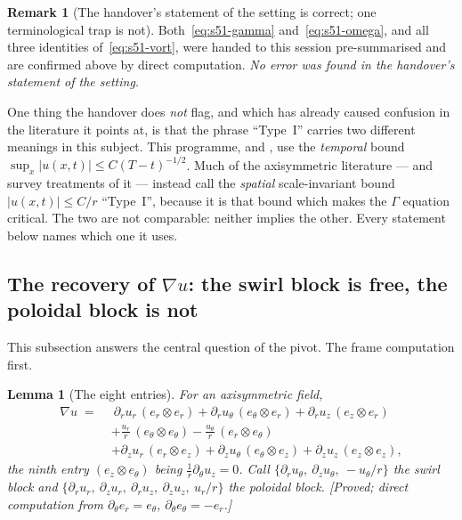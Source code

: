 \documentclass[11pt]{article}
\newtheorem{lemma}[theorem]{Lemma}
\theoremstyle{definition}
\newtheorem{remark}[theorem]{Remark}
\theoremstyle{remark}
\begin{document}
\begin{remark}[The handover's statement of the setting is correct; one
  terminological trap is not]\label{rem:s51-handover}
  Both~\eqref{eq:s51-gamma} and~\eqref{eq:s51-omega}, and all three identities
  of~\eqref{eq:s51-vort}, were handed to this session pre-summarised and are
  confirmed above by direct computation. \emph{No error was found in the
  handover's statement of the setting.}

  One thing the handover does \emph{not} flag, and which has already caused
  confusion in the literature it points at, is that the phrase ``Type~I''
  carries two different meanings in this subject. This programme, and
  \cite{KNSS2009}, use the \emph{temporal} bound
  $\sup_x|u(x,t)|\leq C(T-t)^{-1/2}$. Much of the axisymmetric literature ---
  and survey treatments of it --- instead call the \emph{spatial}
  scale-invariant bound $|u(x,t)|\leq C/r$ ``Type~I'', because it is that
  bound which makes the $\Gamma$ equation critical. The two are not
  comparable: neither implies the other. Every statement below names which one
  it uses.
\end{remark}

\subsection{The recovery of \texorpdfstring{$\nabla u$}{grad u}:
the swirl block is free, the poloidal block is not}
\label{subsec:s51-recovery}

This subsection answers the central question of the pivot. The frame
computation first.

\begin{lemma}[The eight entries]\label{lem:s51-frame}
  For an axisymmetric field,
  \begin{align*}
    \nabla u \;=\;&\ \partial_ru_r\,(e_r\!\otimes\!e_r)
      + \partial_ru_\theta\,(e_\theta\!\otimes\!e_r)
      + \partial_ru_z\,(e_z\!\otimes\!e_r) \\
    &+ \frac{u_r}{r}\,(e_\theta\!\otimes\!e_\theta)
      - \frac{u_\theta}{r}\,(e_r\!\otimes\!e_\theta) \\
    &+ \partial_zu_r\,(e_r\!\otimes\!e_z)
      + \partial_zu_\theta\,(e_\theta\!\otimes\!e_z)
      + \partial_zu_z\,(e_z\!\otimes\!e_z),
  \end{align*}
  the ninth entry $(e_z\!\otimes\!e_\theta)$ being
  $\tfrac1r\partial_\theta u_z=0$. Call
  $\{\partial_ru_\theta,\ \partial_zu_\theta,\ -u_\theta/r\}$ the
  \emph{swirl block} and
  $\{\partial_ru_r,\ \partial_zu_r,\ \partial_ru_z,\ \partial_zu_z,\ u_r/r\}$
  the \emph{poloidal block}. \emph{[Proved; direct computation from
  $\partial_\theta e_r=e_\theta$, $\partial_\theta e_\theta=-e_r$.]}
\end{lemma}
\end{document}
